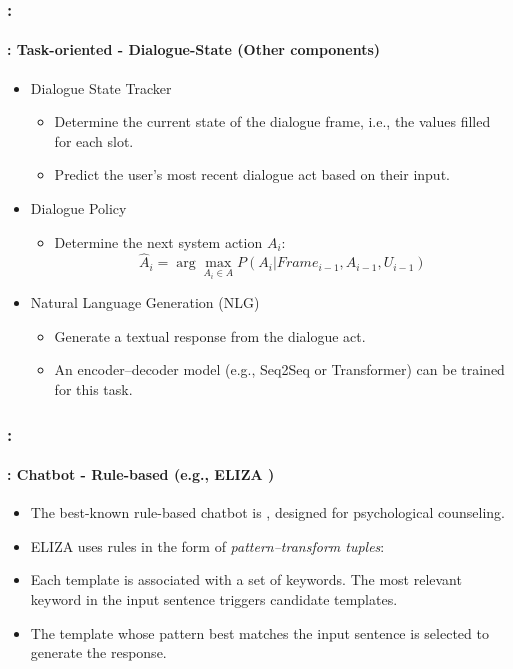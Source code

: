 \documentclass[xcolor=table]{beamer}
\begin{document}
\begin{frame}
	\frametitle{\insertshortsubtitle: \insertsection}
	\framesubtitle{\insertsubsection: Task-oriented - Dialogue-State (Other components)}
	
	\begin{itemize}
		\item Dialogue State Tracker
		\begin{itemize}
			\item Determine the current state of the dialogue frame, i.e., the values filled for each slot.
			\item Predict the user's most recent dialogue act based on their input.
		\end{itemize}
		
		\item Dialogue Policy
		\begin{itemize}
			\item Determine the next system action $A_i$:
			\[\hat{A}_i = \arg\max_{A_i \in A} P(A_i | Frame_{i-1}, A_{i-1}, U_{i-1})\]
		\end{itemize}
		
		\item Natural Language Generation (NLG)
		\begin{itemize}
			\item Generate a textual response from the dialogue act.
			\item An encoder--decoder model (e.g., Seq2Seq or Transformer) can be trained for this task.
		\end{itemize}
	\end{itemize}
	
\end{frame}

\begin{frame}
	\frametitle{\insertshortsubtitle: \insertsection}
	\framesubtitle{\insertsubsection: Chatbot - Rule-based (e.g., ELIZA \cite{1966-Weizenbaum})}
	
	\begin{itemize}
		\item The best-known rule-based chatbot is , designed for psychological counseling.
		\item ELIZA uses rules in the form of \textit{pattern--transform tuples}:
		
		
		\item Each template is associated with a set of keywords. 
		The most relevant keyword in the input sentence triggers candidate templates.
		
		\item The template whose pattern best matches the input sentence is selected to generate the response.
	\end{itemize}
	
\end{frame}
\end{document}
